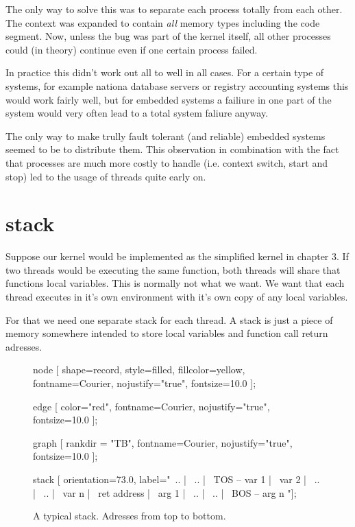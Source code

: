 			The only way to solve this was to separate each process totally from each other. The context was expanded to contain \textit{all} memory types including the code segment. Now, unless the bug was part of the kernel itself, all other processes could (in theory) continue even if one certain process failed.

			In practice this didn't work out all to well in all cases. For a certain type of systems, for example nationa database servers or registry accounting systems this would work fairly well, but for embedded systems a failiure in one part of the system would very often lead to a total system faliure anyway.

			The only way to make trully fault tolerant (and reliable) embedded systems seemed to be to distribute them. This observation in combination with the fact that processes are much more costly to handle (i.e. context switch, start and stop) led to the usage of threads quite early on.\\

			\par

	\section{stack}
		Suppose our kernel would be implemented as the simplified kernel in chapter 3. If two threads would be executing the same function, both threads will share that functions local variables. This is normally not what we want. We want that each thread executes in it's own environment with it's own copy of any local variables.

		For that we need one separate stack for each thread. A stack is just a piece of memory somewhere intended to store local variables and function call return adresses.
		\begin{figure}
		\begin{dotpic}
			node [
				shape=record,
				style=filled,
				fillcolor=yellow,
				fontname=Courier,
				nojustify="true",
				fontsize=10.0
			];

			edge [
				color="red",
				fontname=Courier,
				nojustify="true",
				fontsize=10.0
			];

			graph [
				rankdir = "TB",
				fontname=Courier,
				nojustify="true",
				fontsize=10.0
			];

			stack [ orientation=73.0, label="{\
				..  | \
				..  | \
				TOS --\> var 1         | \
				var 2   | \
				..  | \
				..  | \
				var n  | \
				ret address | \
				arg 1   | \
				..  | \
				..  | \
				BOS --\> arg n }"];
		\end{dotpic}
		\caption{A typical stack. Adresses from top to bottom.\label{stk1}}
		\end{figure}

